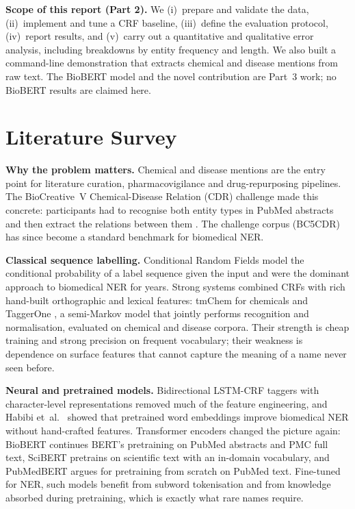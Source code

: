 \documentclass[10pt,a4paper]{article}
\begin{document}
\textbf{Scope of this report (Part 2).} We (i)~prepare and validate the data, (ii)~implement and tune a CRF baseline,
(iii)~define the evaluation protocol, (iv)~report results, and (v)~carry out a quantitative and qualitative error analysis,
including breakdowns by entity frequency and length. We also built a command-line demonstration that extracts chemical and disease mentions from raw text.
The BioBERT model and the novel contribution are Part~3 work; no BioBERT results are claimed here.

\section{Literature Survey}
\textbf{Why the problem matters.} Chemical and disease mentions are the entry point for literature curation, pharmacovigilance and
drug-repurposing pipelines. The BioCreative~V Chemical-Disease Relation (CDR) challenge made this concrete: participants had to recognise
both entity types in PubMed abstracts and then extract the relations between them \cite{wei2016cdr}. The challenge corpus (BC5CDR) \cite{li2016bc5cdr}
has since become a standard benchmark for biomedical NER.

\textbf{Classical sequence labelling.} Conditional Random Fields \cite{lafferty2001crf} model the conditional probability of a label sequence given the input
and were the dominant approach to biomedical NER for years. Strong systems combined CRFs with rich hand-built orthographic and lexical
features: tmChem \cite{leaman2015tmchem} for chemicals and TaggerOne \cite{leaman2016taggerone}, a semi-Markov model that jointly performs recognition and normalisation,
evaluated on chemical and disease corpora. Their strength is cheap training and strong precision on frequent vocabulary; their weakness is dependence
on surface features that cannot capture the meaning of a name never seen before.

\textbf{Neural and pretrained models.} Bidirectional LSTM-CRF taggers with character-level representations \cite{lample2016neural} removed much of the feature engineering,
and Habibi et~al.\ \cite{habibi2017deep} showed that pretrained word embeddings improve biomedical NER without hand-crafted features.
Transformer encoders \cite{devlin2019bert} changed the picture again: BioBERT \cite{lee2020biobert} continues BERT's pretraining on PubMed abstracts and PMC full text,
SciBERT \cite{beltagy2019scibert} pretrains on scientific text with an in-domain vocabulary, and PubMedBERT \cite{gu2021pubmedbert} argues for pretraining from scratch on PubMed
text. Fine-tuned for NER, such models benefit from subword tokenisation and from knowledge absorbed during pretraining, which is exactly what rare names require.
\end{document}
